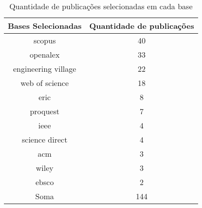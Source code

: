 \begin{table}[H]
\caption{Quantidade de publicações selecionadas em cada base}
\label{table:tertiary_review_databases}
\begin{tabular}{c|c}
\toprule
Bases Selecionadas & Quantidade de publicações \\
\midrule
scopus & 40 \\
openalex & 33 \\
engineering village & 22 \\
web of science & 18 \\
eric & 8 \\
proquest & 7 \\
ieee & 4 \\
science direct & 4 \\
acm & 3 \\
wiley & 3 \\
ebsco & 2 \\
    \hline
Soma & 144 \\
\bottomrule
\end{tabular}
\end{table}